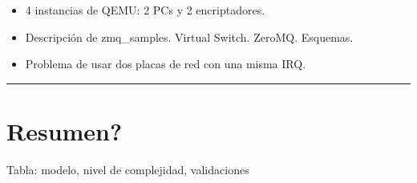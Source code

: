 \begin{itemize}
    \item 4 instancias de QEMU: 2 PCs y 2 encriptadores.
    \item Descripción de zmq\_samples. Virtual Switch. ZeroMQ. Esquemas. 
    \item Problema de usar dos placas de red con una misma IRQ.
\end{itemize}

\noindent\rule{\textwidth}{0.4pt}





\section{Resumen?}
Tabla: modelo, nivel de complejidad, validaciones
